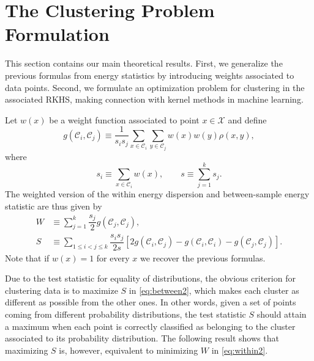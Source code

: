 \documentclass[10pt,journal,compsoc]{IEEEtran}
\newcommand\C{{\mathcal{C}}}
\begin{document}
\section{The Clustering Problem Formulation}
\label{sec:clustering_theory}

This section contains our main theoretical results. First, we
generalize the previous formulas from energy statistics by introducing
weights associated to data points. 
Second, we formulate an optimization problem for clustering 
in the associated RKHS, making connection with kernel methods in
machine learning. 

Let $w(x)$ be a weight function associated to point $x \in \mathcal{X}$
and define
\begin{equation}
\label{eq:g_def2}
g(\C_i, \C_j) \equiv \dfrac{1}{s_i s_j} \sum_{x\in \C_i}\sum_{y\in\C_j}
w(x)w(y) \rho(x,y),
\end{equation}
where
\begin{equation}
s_i \equiv \sum_{x\in\C_i} w(x), \qquad
s \equiv \sum_{j=1}^k s_j.
\end{equation}
The  weighted version of the within energy dispersion 
and between-sample
energy statistic are thus given by
\begin{align}
W &\equiv
\sum_{j=1}^{k} \dfrac{s_j}{2} g(\C_j, \C_j), \label{eq:within2} \\
S &\equiv \!\!\! \sum_{1 \le  i < j \le k } \!\!\! 
\dfrac{s_i s_{j}}{2 s} \left[
2 g(\C_i, \C_j) - 
g(\C_i, \C_i) - 
g(\C_j, \C_j)
\right]. \label{eq:between2}
\end{align}
Note that if $w(x) = 1$ for every $x$ we recover the previous formulas.

Due to the test statistic for equality of distributions,
the obvious criterion for clustering data is to 
maximize $S$ in \eqref{eq:between2},
which makes  each cluster as different as possible from the other ones.
In other words, given a set of points coming from different probability
distributions, the test statistic $S$ should attain a maximum when 
each point is correctly classified as belonging to the cluster associated 
to its probability distribution. The following 
result
shows that maximizing $S$ is, however, equivalent to minimizing
$W$ in \eqref{eq:within2}.%
\end{document}
